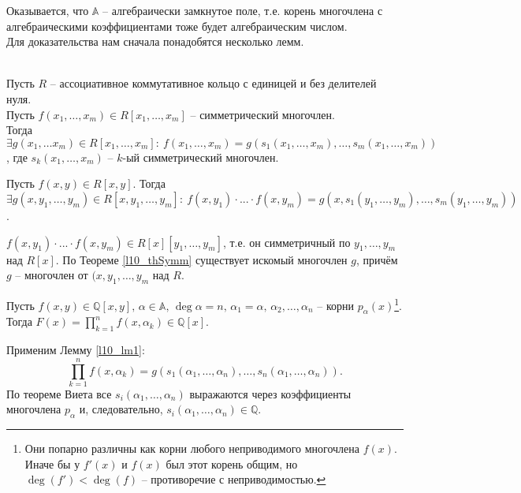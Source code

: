 Оказывается, что $\mathbb{A}$ -- алгебраически замкнутое поле, т.е. корень многочлена с алгебраическими коэффициентами тоже будет алгебраическим числом.\\
Для доказательства нам сначала понадобятся несколько лемм.

\begin{theorem} \label{l10_thSymm}~\\
	Пусть $R$ -- ассоциативное коммутативное кольцо с единицей и без делителей нуля.\\
	Пусть $f \left( x_1, \dots, x_m \right) \in R \left[ x_1, \dots, x_m \right]$ -- симметрический многочлен.\\
	Тогда $\exists g\left( x_1, \dots x_m \right) \in R \left[ x_1, \dots, x_m \right]: \ f\left( x_1, \dots, x_m \right) = g\left( s_1\left( x_1, \dots, x_m \right), \dots, s_m\left( x_1, \dots, x_m \right) \right)$, где $s_k\left( x_1, \dots, x_m \right)$ -- $k$-ый симметрический многочлен.
\end{theorem}

\begin{lemma} \label{l10_lm1}
	Пусть $f(x,y) \in R[x,y]$. Тогда
	$\displaystyle \exists g(x, y_1, \dots, y_m) \in R[x, y_1, \dots, y_m]: \ f(x,y_1)\cdot...\cdot f(x,y_m) = g(x,s_1(y_1,\dots,y_m),\dots,s_m(y_1,\dots,y_m))$.
\end{lemma}
\begin{pf}
	$f(x,y_1) \cdot ... \cdot f(x, y_m) \in R[x][y_1,\dots,y_m]$, т.е. он симметричный по $y_1,\dots,y_m$ над $R[x]$. По Теореме \ref{l10_thSymm} существует искомый многочлен $g$, причём $g$ -- многочлен от $(x,y_1,\dots,y_m$ над $R$.
\end{pf}

\begin{lemma} \label{l10_lm2}
	Пусть $f(x,y) \in \mathbb{Q}[x,y], \, \alpha \in \mathbb{A}, \, \deg\alpha = n, \, \alpha_1 = \alpha, \, \alpha_2,\dots,\alpha_n$ -- корни $p_\alpha(x)$\footnote{Они попарно различны как корни любого неприводимого многочлена $f(x)$. Иначе бы у $f'(x)$ и $f(x)$ был этот корень общим, но $\deg(f') < \deg(f)$ -- противоречие с неприводимостью.}. Тогда $F(x) = \prod\limits_{k=1}^n f(x,\alpha_k) \in \mathbb{Q}[x]$.
\end{lemma}
\begin{pf}
	Применим Лемму \ref{l10_lm1}:
	$$\prod\limits_{k=1}^n f(x, \alpha_k) = g\left( s_1\left( \alpha_1, \dots, \alpha_n \right), \dots, s_n\left( \alpha_1, \dots, \alpha_n \right) \right).$$
	По теореме Виета все $s_i(\alpha_1,\dots,\alpha_n)$ выражаются через коэффициенты многочлена $p_\alpha$ и, следовательно, $s_i(\alpha_1,\dots,\alpha_n) \in \mathbb{Q}$.
\end{pf}

